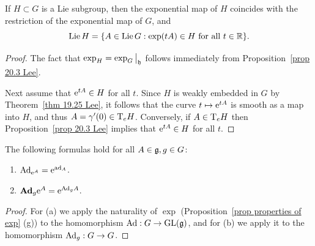 \begin{prop}\label{prop 20.9 Lee}
    If $H\subset G$ is a Lie subgroup, then the exponential map of $H$ coincides with the restriction of the exponential map of $G$, and 
    \[\operatorname{Lie} H=\{A\in\operatorname{Lie} G: \exp(tA)\in H \text{ for all } t\in \mathbb{R}\}.\]
\end{prop}
\begin{proof}
    The fact that $\exp_H=\restr{\exp_G}{\frakh}$ follows immediately from Proposition~\ref{prop 20.3 Lee}.

    Next assume that $\mathrm{e}^{tA}\in H$ for all $t$. Since $H$ is weakly embedded in $G$ by Theorem~\ref{thm 19.25 Lee}, it follows that the curve $t\mapsto \mathrm{e}^{tA}$ is smooth as a map into $H$, and thus $A=\gamma'(0)\in \mathrm{T}_eH$. Conversely, if $A\in \mathrm{T}_e H$ then Proposition~\ref{prop 20.3 Lee} implies that $\mathrm{e}^{tA}\in H$ for all $t$.
\end{proof}


\begin{thm}\label{thm 1.5.2 DK}
    The following formulas hold for all $A\in\mathfrak{g},g\in G$:
    \begin{enumerate}[label=(\alph*)]
        \item $\mathrm{Ad}_{\mathrm{e}^A}=\mathrm{e}^{\mathrm{ad}_A}$.
        \item $\mathrm{\mathbf{Ad}}_g \mathrm{e}^A=\mathrm{e}^{\mathrm{Ad}_g A}$.
    \end{enumerate}
\end{thm}
\begin{proof}
    For (a) we apply the naturality of $\exp$ (Proposition~\ref{prop properties of exp} (g)) to the homomorphism $\mathrm{Ad}:G\to \operatorname{GL}(\mathfrak{g})$, and for (b) we apply it to the homomorphism $\mathrm{Ad}_g:G\to G$.
\end{proof}



